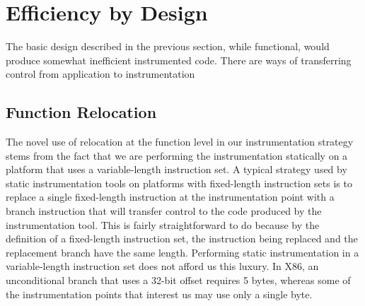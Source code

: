 \section{Efficiency by Design}

The basic design described in the previous section, while functional, would produce
somewhat inefficient instrumented code. There are ways of transferring control
from application to instrumentation 


\subsection{Function Relocation}
The novel use of relocation at the function level in our instrumentation strategy stems from the fact
that we are performing the instrumentation statically on a platform that uses a
variable-length instruction set. A typical strategy used by static
instrumentation tools on platforms with fixed-length instruction sets is to
replace a single fixed-length instruction at the instrumentation point with a
branch instruction that will transfer control to the code produced by the
instrumentation tool. This is fairly straightforward to do because by the
definition of a fixed-length instruction set, the instruction being replaced and
the replacement branch have the same length. Performing static instrumentation
in a variable-length instruction set does not afford us this luxury. In X86, an
unconditional branch that uses a 32-bit offset requires 5 bytes, whereas some of
the instrumentation points that interest us may use only a single byte.

